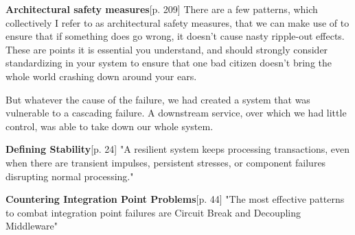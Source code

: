 \textbf{Architectural safety measures}\cite{newman2015microservices}[p. 209]
There are a few patterns, which collectively I refer to as architectural safety measures, that we can make use of to ensure that if something does go wrong, it doesn’t cause nasty ripple-out effects. These are points it is essential you understand, and should strongly consider standardizing in your system to ensure that one bad citizen doesn’t bring the whole world crashing down around your ears.


But whatever the cause of the failure, we had created a system that was vulnerable to a cascading failure. A downstream service, over which we had little control, was able to take down our whole system.


\textbf{Defining Stability}\cite{nygard2007release}[p. 24]
"A resilient system keeps processing transactions, even when there are transient impulses, persistent stresses, or component failures disrupting normal processing."

\textbf{Countering Integration Point Problems}\cite{nygard2007release}[p. 44]
"The most effective patterns to combat integration point failures are Circuit Break and Decoupling Middleware"